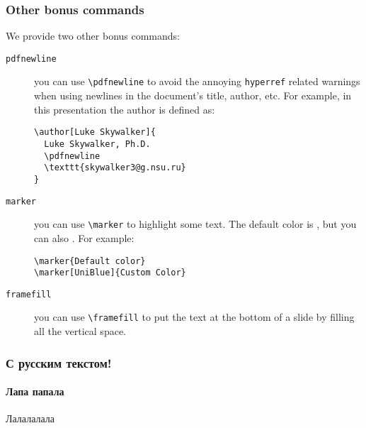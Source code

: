 \documentclass[usenames,dvipsnames,]{beamer}
\newcommand{\pdfnewline}{\texorpdfstring{\newline}{ }}
\begin{document}
\begin{frame}
\frametitle{Other bonus commands}

We provide two other bonus commands:
\begin{description}
\item[\texttt{pdfnewline}] you can use \texttt{\textbackslash pdfnewline} to avoid the annoying \texttt{hyperref} related warnings when using newlines in the document's title, author, etc. For example, in this presentation the author is defined as:
\begin{verbatim}
\author[Luke Skywalker]{
  Luke Skywalker, Ph.D.
  \pdfnewline
  \texttt{skywalker3@g.nsu.ru}
}
\end{verbatim}
\item[\texttt{marker}] you can use \texttt{\textbackslash marker} to highlight some text. The default color is , but you can also . For example:
\begin{verbatim}
\marker{Default color}
\marker[UniBlue]{Custom Color}
\end{verbatim}
\item[\texttt{framefill}] you can use \texttt{\textbackslash framefill} to put the text at the bottom of a slide by filling all the vertical space.
\end{description}

\end{frame}

\begin{frame}
\frametitle{С русским текстом!}\framesubtitle{Лапа папала}
Лалалалала
\end{frame}
\end{document}
